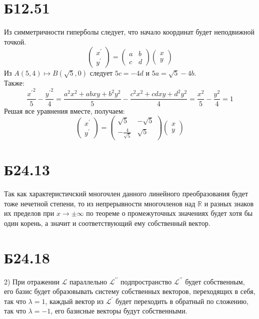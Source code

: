 \section*{Б12.51} Из симметричности гиперболы следует, что начало координат будет неподвижной точкой.
$$\begin{pmatrix*}
    x^{\prime}\\y^{\prime}
\end{pmatrix*}=\begin{pmatrix*}
    a&b\\
    c&d
\end{pmatrix*}\begin{pmatrix*}
    x\\y
\end{pmatrix*}$$
Из $A(5,4)\mapsto B(\sqrt{5},0)$ следует $5c=-4d$ и $5a=\sqrt{5}-4b$.\\
Также:
$$\frac{{x^{\prime}}^{2}}{5}-\frac{{y^{\prime}}^{2}}{4}=\frac{a^2x^2+abxy+b^2y^2}{5}-\frac{c^2x^2+cdxy+d^2y^2}{4}=\frac{x^{2}}{5}-\frac{y^{2}}{4}=1$$
Решая все уравнения вместе, получаем:
$$\begin{pmatrix*}
    x^{\prime}\\y^{\prime}
\end{pmatrix*}=\begin{pmatrix*}
    \sqrt{5}&-\sqrt{5}\\
    -\frac{4}{\sqrt{5}}&\sqrt{5}
\end{pmatrix*}\begin{pmatrix*}
    x\\y
\end{pmatrix*}$$
\section*{Б24.13} Так как характеристичский многочлен данного линейного преобразования будет тоже нечетной степени, то из непрерывности многочленов над $\mathbb{R}$ и разных знаков их пределов при $x\to\pm\infty$ по теореме о промежуточных значениях будет хотя бы один корень, а значит и соответствующий ему собственный вектор.
\section*{Б24.18}2) При отражении $\mathcal{L}$ параллельно $\mathcal{L}^{\prime\prime}$ подпространство $\mathcal{L}^{\prime\prime}$ будет собственным, его базис будет образовывать систему собственных векторов, переходящих в себя, так что $\lambda=1$, каждый вектор из $\mathcal{L}^{\prime}$ будет переходить в обратный по сложению, так что $\lambda=-1$, его базисные векторы будут собственными.
